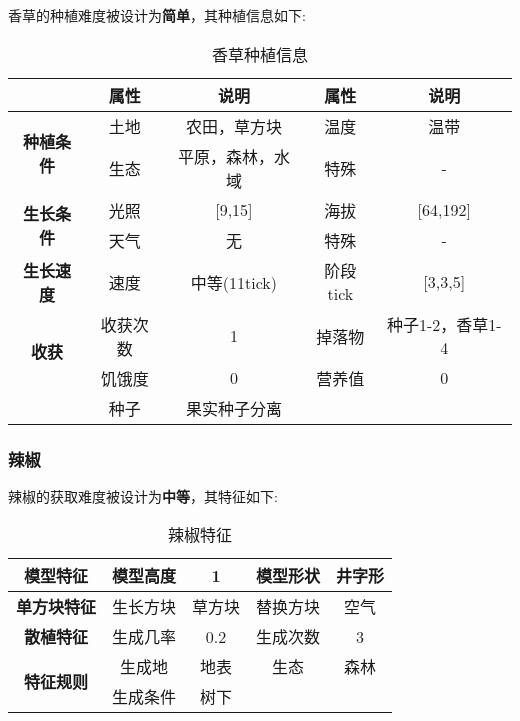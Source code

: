 香草的种植难度被设计为\textbf{简单}，其种植信息如下:

\begin{table}[H]
    \centering
    \caption{香草种植信息}
    \label{table:香草种植信息}
    \setlength{\tabcolsep}{4mm}
    \begin{tabular}{c|cc|cc}
        \toprule
                                           & \textbf{属性} & \textbf{说明}    & \textbf{属性} & \textbf{说明}    \\
        \midrule
        \multirow{2}{*}{\textbf{种植条件}} & 土地          & 农田，草方块     & 温度          & 温带             \\
                                           & 生态          & 平原，森林，水域 & 特殊          & -                \\
        \midrule
        \multirow{2}{*}{\textbf{生长条件}} & 光照          & [9,15]           & 海拔          & [64,192]         \\
                                           & 天气          & 无               & 特殊          & -                \\
        \midrule
        \textbf{生长速度}                  & 速度          & 中等(11tick)     & 阶段tick      & [3,3,5]          \\
        \midrule
        \multirow{2}{*}{\textbf{收获}}     & 收获次数      & 1                & 掉落物        & 种子1-2，香草1-4 \\
                                           & 饥饿度        & 0                & 营养值        & 0                \\
                                           & 种子 & 果实种子分离 \\
        \bottomrule
    \end{tabular}
\end{table}

\subsubsection{辣椒}

辣椒的获取难度被设计为\textbf{中等}，其特征如下:
\begin{table}[H]
    \centering
    \caption{辣椒特征}
    \label{table:辣椒特征}
    \setlength{\tabcolsep}{4mm}
    \begin{tabular}{c|cc|cc}
        \toprule
        \textbf{模型特征}                  & 模型高度 & 1      & 模型形状 & 井字形 \\
        \midrule
        \textbf{单方块特征}                & 生长方块 & 草方块 & 替换方块 & 空气   \\
        \midrule
        \textbf{散植特征}                  & 生成几率 & 0.2    & 生成次数 & 3      \\
        \midrule
        \multirow{2}{*}{\textbf{特征规则}} & 生成地   & 地表   & 生态     & 森林   \\
                                           & 生成条件 & 树下                       \\
        \bottomrule
    \end{tabular}
\end{table}


